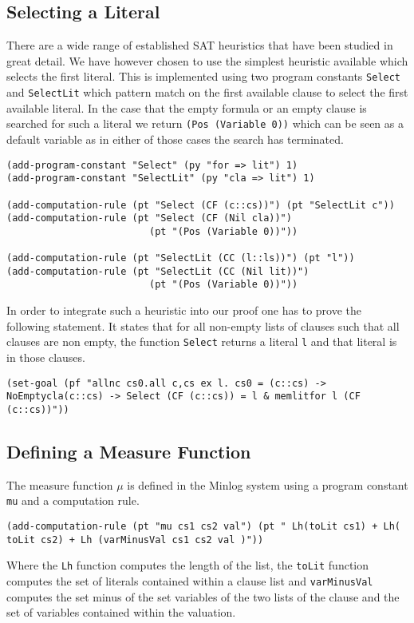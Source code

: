 \subsection*{Selecting a Literal}
There are a wide range of established SAT heuristics that have been studied in great detail. We have however chosen to use the simplest heuristic available which selects the first literal. This is implemented using two program constants \texttt{Select} and \texttt{SelectLit} which pattern match on the first available clause to select the first available literal. In the case that the empty formula or an empty clause is searched for such a literal we return \texttt{(Pos (Variable 0))} which can be seen as a default variable as in either of those cases the search has terminated. 

\begin{lstlisting}[caption = The Literal Selection Function]
(add-program-constant "Select" (py "for => lit") 1)
(add-program-constant "SelectLit" (py "cla => lit") 1)

(add-computation-rule (pt "Select (CF (c::cs))") (pt "SelectLit c"))
(add-computation-rule (pt "Select (CF (Nil cla))")  
                         (pt "(Pos (Variable 0))")) 

(add-computation-rule (pt "SelectLit (CC (l::ls))") (pt "l"))
(add-computation-rule (pt "SelectLit (CC (Nil lit))") 
                         (pt "(Pos (Variable 0))"))
\end{lstlisting}

In order to integrate such a heuristic into our proof one has to prove the following statement. It states that for all non-empty lists of clauses such that all clauses are non empty, the function \texttt{Select} returns a literal \texttt{l} and that literal is in those clauses.

\begin{center}
\texttt{(set-goal (pf "allnc cs0.all c,cs ex l. cs0 = (c::cs) -> NoEmptycla(c::cs) -> Select (CF (c::cs)) = l \& memlitfor l (CF (c::cs))"))}
\end{center}


\subsection{Defining a Measure Function}
The measure function $\mu$ is defined in the Minlog system using a program constant \texttt{mu} and a computation rule.
\begin{center}
\texttt{(add-computation-rule (pt "mu cs1 cs2 val") (pt " Lh(toLit cs1) + Lh( toLit cs2) + Lh (varMinusVal cs1 cs2 val )"))}
\end{center}
Where the \texttt{Lh} function computes the length of the list, the \texttt{toLit} function computes the set of literals contained within a clause list and \texttt{varMinusVal} computes the set minus of the set variables of the two lists of the clause and the set of variables contained within the valuation.

